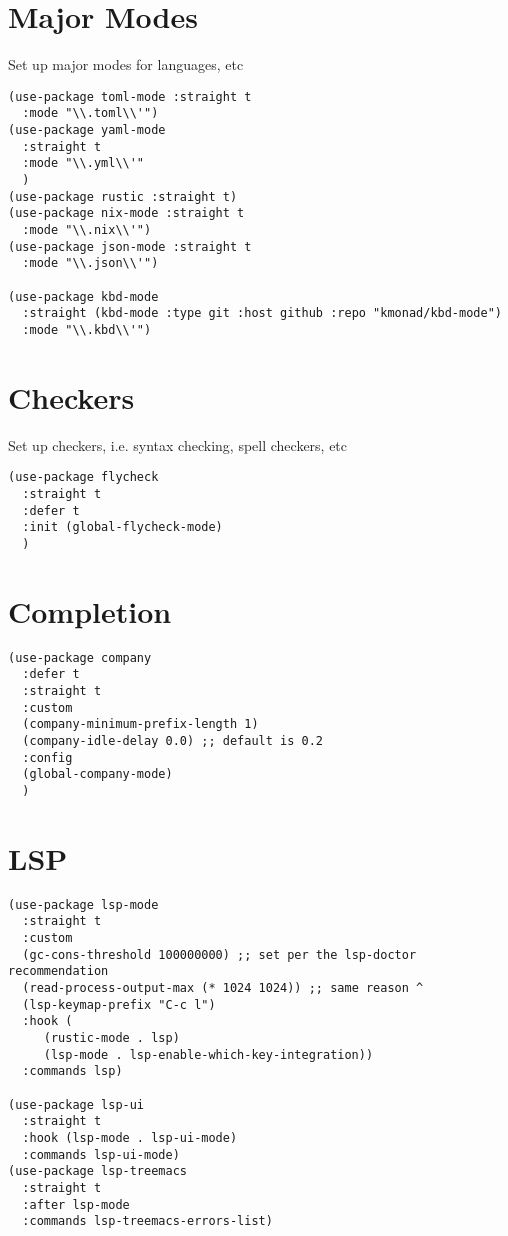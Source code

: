 \documentclass[11pt]{article}
\begin{document}
\section{Major Modes}
\label{sec:orgefd555c}
Set up major modes for languages, etc
\begin{verbatim}
(use-package toml-mode :straight t
  :mode "\\.toml\\'")
(use-package yaml-mode
  :straight t
  :mode "\\.yml\\'"
  )
(use-package rustic :straight t)
(use-package nix-mode :straight t
  :mode "\\.nix\\'")
(use-package json-mode :straight t
  :mode "\\.json\\'")

(use-package kbd-mode
  :straight (kbd-mode :type git :host github :repo "kmonad/kbd-mode")
  :mode "\\.kbd\\'")
\end{verbatim}
\section{Checkers}
\label{sec:org1a70892}
Set up checkers, i.e. syntax checking, spell checkers, etc
\begin{verbatim}
(use-package flycheck
  :straight t
  :defer t
  :init (global-flycheck-mode)
  )
\end{verbatim}
\section{Completion}
\label{sec:org082af65}
\begin{verbatim}
(use-package company
  :defer t
  :straight t
  :custom
  (company-minimum-prefix-length 1)
  (company-idle-delay 0.0) ;; default is 0.2
  :config
  (global-company-mode)
  )
\end{verbatim}

\section{LSP}
\label{sec:orgb90c6b0}
\begin{verbatim}
(use-package lsp-mode
  :straight t
  :custom
  (gc-cons-threshold 100000000) ;; set per the lsp-doctor recommendation
  (read-process-output-max (* 1024 1024)) ;; same reason ^
  (lsp-keymap-prefix "C-c l")
  :hook (
	 (rustic-mode . lsp)
	 (lsp-mode . lsp-enable-which-key-integration))
  :commands lsp)

(use-package lsp-ui
  :straight t
  :hook (lsp-mode . lsp-ui-mode)
  :commands lsp-ui-mode)
(use-package lsp-treemacs
  :straight t
  :after lsp-mode
  :commands lsp-treemacs-errors-list)
\end{verbatim}
\end{document}
